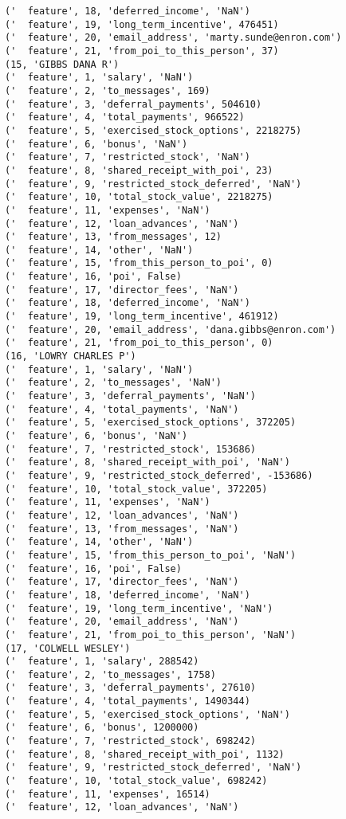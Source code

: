 \begin{verbatim}
('  feature', 18, 'deferred_income', 'NaN')
('  feature', 19, 'long_term_incentive', 476451)
('  feature', 20, 'email_address', 'marty.sunde@enron.com')
('  feature', 21, 'from_poi_to_this_person', 37)
(15, 'GIBBS DANA R')
('  feature', 1, 'salary', 'NaN')
('  feature', 2, 'to_messages', 169)
('  feature', 3, 'deferral_payments', 504610)
('  feature', 4, 'total_payments', 966522)
('  feature', 5, 'exercised_stock_options', 2218275)
('  feature', 6, 'bonus', 'NaN')
('  feature', 7, 'restricted_stock', 'NaN')
('  feature', 8, 'shared_receipt_with_poi', 23)
('  feature', 9, 'restricted_stock_deferred', 'NaN')
('  feature', 10, 'total_stock_value', 2218275)
('  feature', 11, 'expenses', 'NaN')
('  feature', 12, 'loan_advances', 'NaN')
('  feature', 13, 'from_messages', 12)
('  feature', 14, 'other', 'NaN')
('  feature', 15, 'from_this_person_to_poi', 0)
('  feature', 16, 'poi', False)
('  feature', 17, 'director_fees', 'NaN')
('  feature', 18, 'deferred_income', 'NaN')
('  feature', 19, 'long_term_incentive', 461912)
('  feature', 20, 'email_address', 'dana.gibbs@enron.com')
('  feature', 21, 'from_poi_to_this_person', 0)
(16, 'LOWRY CHARLES P')
('  feature', 1, 'salary', 'NaN')
('  feature', 2, 'to_messages', 'NaN')
('  feature', 3, 'deferral_payments', 'NaN')
('  feature', 4, 'total_payments', 'NaN')
('  feature', 5, 'exercised_stock_options', 372205)
('  feature', 6, 'bonus', 'NaN')
('  feature', 7, 'restricted_stock', 153686)
('  feature', 8, 'shared_receipt_with_poi', 'NaN')
('  feature', 9, 'restricted_stock_deferred', -153686)
('  feature', 10, 'total_stock_value', 372205)
('  feature', 11, 'expenses', 'NaN')
('  feature', 12, 'loan_advances', 'NaN')
('  feature', 13, 'from_messages', 'NaN')
('  feature', 14, 'other', 'NaN')
('  feature', 15, 'from_this_person_to_poi', 'NaN')
('  feature', 16, 'poi', False)
('  feature', 17, 'director_fees', 'NaN')
('  feature', 18, 'deferred_income', 'NaN')
('  feature', 19, 'long_term_incentive', 'NaN')
('  feature', 20, 'email_address', 'NaN')
('  feature', 21, 'from_poi_to_this_person', 'NaN')
(17, 'COLWELL WESLEY')
('  feature', 1, 'salary', 288542)
('  feature', 2, 'to_messages', 1758)
('  feature', 3, 'deferral_payments', 27610)
('  feature', 4, 'total_payments', 1490344)
('  feature', 5, 'exercised_stock_options', 'NaN')
('  feature', 6, 'bonus', 1200000)
('  feature', 7, 'restricted_stock', 698242)
('  feature', 8, 'shared_receipt_with_poi', 1132)
('  feature', 9, 'restricted_stock_deferred', 'NaN')
('  feature', 10, 'total_stock_value', 698242)
('  feature', 11, 'expenses', 16514)
('  feature', 12, 'loan_advances', 'NaN')

\end{verbatim}
